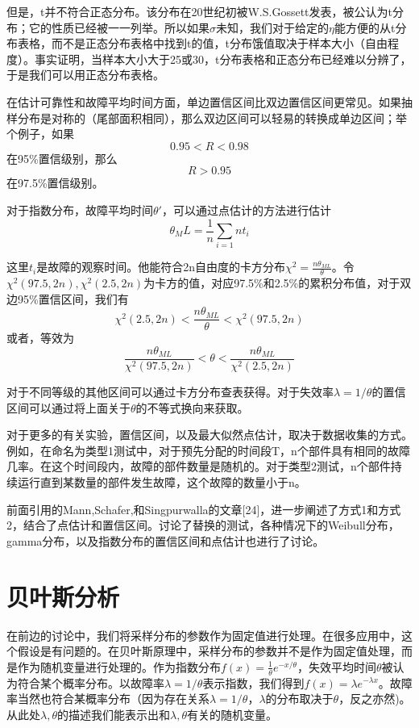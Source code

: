 \documentclass[cn,11pt,chinese]{elegantbook}
\begin{document}
{但是，t并不符合正态分布。该分布在20世纪初被W.S.Gossett发表，被公认为t分布；它的性质已经被一一列举。所以如果$\sigma$未知，我们对于给定的$\eta$能方便的从t分布表格，而不是正态分布表格中找到t的值，t分布饿值取决于样本大小（自由程度）。事实证明，当样本大小大于25或30，t分布表格和正态分布已经难以分辨了，于是我们可以用正态分布表格。

在估计可靠性和故障平均时间方面，单边置信区间比双边置信区间更常见。如果抽样分布是对称的（尾部面积相同），那么双边区间可以轻易的转换成单边区间；举个例子，如果
$$0.95<R<0.98$$
在95\%置信级别，那么
$$R>0.95$$
在97.5\%置信级别。

对于指数分布，故障平均时间$\theta'$，可以通过点估计的方法进行估计
$$\theta_ML=\frac{1}{n}\sum_{i=1}{n}t_i$$

这里$t_i$是故障的观察时间。他能符合2n自由度的卡方分布$\chi^2=\frac{n\theta_{ML}}{\theta}$。令$\chi^2(97.5,2n), \chi^2(2.5,2n)$为卡方的值，对应97.5\%和2.5\%的累积分布值，对于双边95\%置信区间，我们有
$$\chi^2(2.5,2n)<\frac{n\theta_{ML}}{\theta}<\chi^2(97.5,2n)$$
或者，等效为
$$
\frac{n\theta_{ML}}{\chi^2(97.5,2n)}<\theta<\frac{n\theta_{ML}}{\chi^2(2.5,2n)}$$

对于不同等级的其他区间可以通过卡方分布查表获得。对于失效率$\lambda = 1/\theta$的置信区间可以通过将上面关于$\theta$的不等式换向来获取。

对于更多的有关实验，置信区间，以及最大似然点估计，取决于数据收集的方式。例如，在命名为类型1测试中，对于预先分配的时间段T，n个部件具有相同的故障几率。在这个时间段内，故障的部件数量是随机的。对于类型2测试，n个部件持续运行直到某数量的部件发生故障，这个故障的数量小于n。

前面引用的Mann,Schafer,和Singpurwalla的文章[24]，进一步阐述了方式1和方式2，结合了点估计和置信区间。讨论了替换的测试，各种情况下的Weibull分布，gamma分布，以及指数分布的置信区间和点估计也进行了讨论。

\section{贝叶斯分析}

在前边的讨论中，我们将采样分布的参数作为固定值进行处理。在很多应用中，这个假设是有问题的。在贝叶斯原理中，采样分布的参数并不是作为固定值处理，而是作为随机变量进行处理的。作为指数分布$f(x)=\frac{1}{\theta}e^{-x/\theta}$，失效平均时间$\theta$被认为符合某个概率分布。以故障率$\lambda=1/\theta$表示指数，我们得到$f(x)=\lambda e^{-\lambda x}$。故障率当然也符合某概率分布（因为存在关系$\lambda = 1/\theta$，$\lambda$的分布取决于$\theta$，反之亦然)。从此处$\lambda,\theta$的描述我们能表示出和$\lambda,\theta$有关的随机变量。

}
\end{document}
